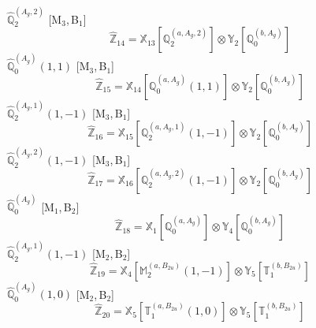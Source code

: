 \documentclass[fleqn,10pt,landscape]{article}
\begin{document}
\begin{itemize}
\noindent {} $\,\,\,\hat{\mathbb{Q}}_{2}^{(A_{g},2)}$ [M$_{3}$,\,B$_{1}$]
\begin{dmath*}
\hat{\mathbb{Z}}_{14}=\mathbb{X}_{13}[\mathbb{Q}_{2}^{(a,A_{g},2)}] \otimes\mathbb{Y}_{2}[\mathbb{Q}_{0}^{(b,A_{g})}]
\end{dmath*}
\vspace{4mm}
\noindent {} $\,\,\,\hat{\mathbb{Q}}_{0}^{(A_{g})}(1,1)$ [M$_{3}$,\,B$_{1}$]
\begin{dmath*}
\hat{\mathbb{Z}}_{15}=\mathbb{X}_{14}[\mathbb{Q}_{0}^{(a,A_{g})}(1,1)] \otimes\mathbb{Y}_{2}[\mathbb{Q}_{0}^{(b,A_{g})}]
\end{dmath*}
\vspace{4mm}
\noindent {} $\,\,\,\hat{\mathbb{Q}}_{2}^{(A_{g},1)}(1,-1)$ [M$_{3}$,\,B$_{1}$]
\begin{dmath*}
\hat{\mathbb{Z}}_{16}=\mathbb{X}_{15}[\mathbb{Q}_{2}^{(a,A_{g},1)}(1,-1)] \otimes\mathbb{Y}_{2}[\mathbb{Q}_{0}^{(b,A_{g})}]
\end{dmath*}
\vspace{4mm}
\noindent {} $\,\,\,\hat{\mathbb{Q}}_{2}^{(A_{g},2)}(1,-1)$ [M$_{3}$,\,B$_{1}$]
\begin{dmath*}
\hat{\mathbb{Z}}_{17}=\mathbb{X}_{16}[\mathbb{Q}_{2}^{(a,A_{g},2)}(1,-1)] \otimes\mathbb{Y}_{2}[\mathbb{Q}_{0}^{(b,A_{g})}]
\end{dmath*}
\vspace{4mm}
\noindent {} $\,\,\,\hat{\mathbb{Q}}_{0}^{(A_{g})}$ [M$_{1}$,\,B$_{2}$]
\begin{dmath*}
\hat{\mathbb{Z}}_{18}=\mathbb{X}_{1}[\mathbb{Q}_{0}^{(a,A_{g})}] \otimes\mathbb{Y}_{4}[\mathbb{Q}_{0}^{(b,A_{g})}]
\end{dmath*}
\vspace{4mm}
\noindent {} $\,\,\,\hat{\mathbb{Q}}_{2}^{(A_{g},1)}(1,-1)$ [M$_{2}$,\,B$_{2}$]
\begin{dmath*}
\hat{\mathbb{Z}}_{19}=\mathbb{X}_{4}[\mathbb{M}_{2}^{(a,B_{2u})}(1,-1)] \otimes\mathbb{Y}_{5}[\mathbb{T}_{1}^{(b,B_{2u})}]
\end{dmath*}
\vspace{4mm}
\noindent {} $\,\,\,\hat{\mathbb{Q}}_{0}^{(A_{g})}(1,0)$ [M$_{2}$,\,B$_{2}$]
\begin{dmath*}
\hat{\mathbb{Z}}_{20}=\mathbb{X}_{5}[\mathbb{T}_{1}^{(a,B_{2u})}(1,0)] \otimes\mathbb{Y}_{5}[\mathbb{T}_{1}^{(b,B_{2u})}]
\end{dmath*}
\vspace{4mm}

\end{itemize}
\end{document}
